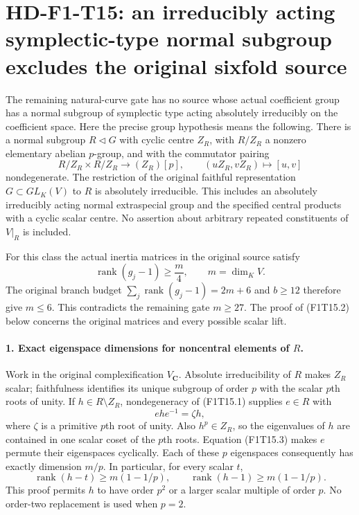 \section[HD-F1-T15: irreducible symplectic-type normal subgroups]{HD-F1-T15: an irreducibly acting symplectic-type normal subgroup excludes the original sixfold source}
\label{sec:f1-symplectic-type-source-exclusion}

The remaining natural-curve gate has no source whose actual coefficient
group has a normal subgroup of symplectic type acting absolutely
irreducibly on the coefficient space. Here the precise group hypothesis
means the following. There is a normal subgroup $R\triangleleft G$
with cyclic centre $Z_R$, with $R/Z_R$ a nonzero elementary abelian
$p$-group, and with the commutator pairing
\[
 R/Z_R\times R/Z_R\longrightarrow (Z_R)[p],\qquad
 (uZ_R,vZ_R)\longmapsto [u,v]
 \tag{F1T15.1}
\]
nondegenerate. The restriction of the original faithful representation
$G\subset GL_K(V)$ to $R$ is absolutely irreducible. This includes
an absolutely irreducibly acting normal extraspecial group and the
specified central products with a cyclic scalar centre. No assertion
about arbitrary repeated constituents of $V|_R$ is included.

For this class the actual inertia matrices in the original source
satisfy
\[
 \operatorname{rank}(g_j-1)\ge\frac m4,
       \qquad m=\dim_K V.
 \tag{F1T15.2}
\]
The original branch budget $\sum_j\operatorname{rank}(g_j-1)=2m+6$
and $b\ge12$ therefore give $m\le6$. This contradicts the remaining
gate $m\ge27$. The proof of (F1T15.2) below concerns the original
matrices and every possible scalar lift.

\paragraph{1. Exact eigenspace dimensions for noncentral elements of $R$.}
Work in the original complexification $V_{\mathbf C}$.
Absolute irreducibility of $R$ makes $Z_R$ scalar; faithfulness
identifies its unique subgroup of order $p$ with the scalar
$p$th roots of unity. If $h\in R\setminus Z_R$, nondegeneracy
of (F1T15.1) supplies $e\in R$ with
\[
                     ehe^{-1}=\zeta h,
 \tag{F1T15.3}
\]
where $\zeta$ is a primitive $p$th root of unity.
Also $h^p\in Z_R$, so the eigenvalues of $h$ are contained in
one scalar coset of the $p$th roots. Equation (F1T15.3) makes
$e$ permute their eigenspaces cyclically. Each of these $p$
eigenspaces consequently has exactly dimension $m/p$.
In particular, for every scalar $t$,
\[
 \operatorname{rank}(h-t)\ge m(1-1/p),\qquad
 \operatorname{rank}(h-1)\ge m(1-1/p).
 \tag{F1T15.4}
\]
This proof permits $h$ to have order $p^2$ or a larger scalar
multiple of order $p$. No order-two replacement is used when $p=2$.

